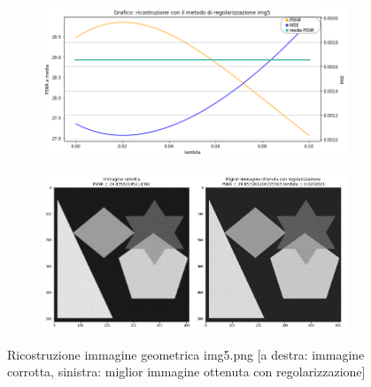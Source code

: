 \begin{figure}[H]
    \centering
    \begin{subfigure}{0.5\textwidth}
        \includegraphics[width=\textwidth]{imgRicostruzione/grafico5minimize.png}
    \end{subfigure}%
    \begin{subfigure}{0.5\textwidth}
        \centering
        \includegraphics[width=\textwidth]{imgRicostruzione/ricostruzione5minimize.png}
    \end{subfigure}
    \caption{Ricostruzione immagine geometrica img5.png [a destra: immagine corrotta, sinistra: miglior immagine ottenuta con regolarizzazione]}
    

\end{figure}

